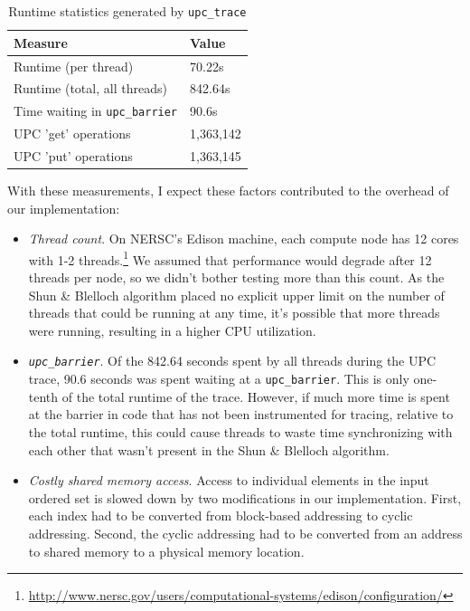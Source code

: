 \documentclass[10pt]{article}
\begin{document}
\begin{table}[t]
\caption{Runtime statistics generated by \texttt{upc\_trace}}
\vspace{1.5ex}
\label{tab:trace_measurements}
\centering
\begin{tabular}{ll}
\toprule
\textbf{Measure} & \textbf{Value} \\
\midrule
Runtime (per thread) & 70.22s \\ \midrule
Runtime (total, all threads) & 842.64s \\ \midrule
Time waiting in \texttt{upc\_barrier} & 90.6s \\ \midrule
UPC 'get' operations & 1,363,142 \\ \midrule
UPC 'put' operations & 1,363,145 \\ \bottomrule
\end{tabular}
\end{table}

With these measurements, I expect these factors contributed to the overhead of our
implementation:
\begin{itemize}
  \item \emph{Thread count}.
        On NERSC's Edison machine, each compute node has 12 cores with 1-2 
        threads.\footnote{\url{http://www.nersc.gov/users/computational-systems/edison/configuration/}}
        We assumed that performance would degrade after 12 threads per node, so we didn't
        bother testing more than this count.
        As the Shun \& Blelloch algorithm placed no explicit upper limit on the number of threads
        that could be running at any time, it's possible that more threads were running, resulting
        in a higher CPU utilization.
  \item \emph{\texttt{upc\_barrier}}.
        Of the 842.64 seconds spent by all threads during the UPC trace, 90.6 seconds was
        spent waiting at a \texttt{upc\_barrier}.
        This is only one-tenth of the total runtime of the trace.
        However, if much more time is spent at the barrier in code that has not been instrumented
        for tracing, relative to the total runtime, this could cause threads to waste time
        synchronizing with each other that wasn't present in the Shun \& Blelloch algorithm.
  \item \emph{Costly shared memory access}.
        Access to individual elements in the input ordered set is slowed down by two modifications
        in our implementation.
        First, each index had to be converted from block-based addressing to cyclic addressing.
        Second, the cyclic addressing had to be converted from an address to shared memory to a
        physical memory location.
\end{itemize}
\end{document}
